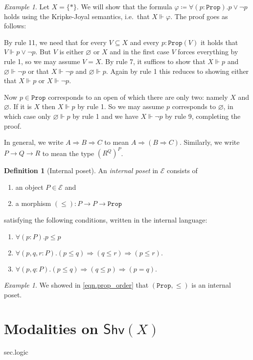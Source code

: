 \documentclass[11pt, oneside, article]{memoir}
\theoremstyle{plain}
\theoremstyle{definition}
\newtheorem{definition}[theorem]{Definition}
\theoremstyle{remark}
\newtheorem{example}[theorem]{Example}
\renewcommand{\ss}{\subseteq}
\newcommand{\const}[1]{\mathtt{#1}}
\newcommand{\cat}[1]{\mathcal{#1}}
\newcommand{\Fun}[1]{\mathsf{#1}}
\newcommand{\forces}{\Vdash}
\newcommand{\shv}{\Fun{Shv}}
\newcommand{\prop}{\const{Prop}}
\newcommand{\imp}{\Rightarrow}
\begin{document}
\begin{example}
Let $X=\{*\}$. We will show that the formula $\varphi\coloneqq\forall (p:\prop).p\vee\neg p$ holds using the Kripke-Joyal semantics, i.e.\ that $X\forces\varphi$. The proof goes as follows:

By rule 11, we need that for every $V\ss X$ and every $p:\prop(V)$ it holds that $V\forces p\vee\neg p$. But $V$ is either $\varnothing$ or $X$ and in the first case $V$ forces everything by rule 1, so we may assume $V=X$. By rule 7, it suffices to show that $X\forces p$ and $\varnothing\forces\neg p$ or that $X\forces\neg p$ and $\varnothing\forces p$. Again by rule 1 this reduces to showing either that $X\forces p$ or $X\forces\neg p$.

Now $p\in\prop$ corresponds to an open of which there are only two: namely $X$ and $\varnothing$. If it is $X$ then $X\forces p$ by rule 1. So we may assume $p$ corresponds to $\varnothing$, in which case only $\varnothing\forces p$ by rule 1 and we have $X\forces\neg p$ by rule 9, completing the proof.
\end{example}

In general, we write $A\imp B\imp C$ to mean $A\imp(B\imp C)$. Similarly, we write $P\to Q\to R$ to mean the type $(R^Q)^P$.

\begin{definition}[Internal poset]\label{def.internal_poset}
An \emph{internal poset} in $\cat{E}$ consists of
\begin{enumerate}
	\item an object $P\in\cat{E}$ and
	\item a morphism $(\leq)\colon P\to P\to\prop$
\end{enumerate}
satisfying the following conditions, written in the internal language:
\begin{enumerate}[label=\alph*.]
	\item $\forall (p:P).p\leq p$
	\item $\forall (p,q,r:P).(p\leq q)\imp (q\leq r)\imp(p\leq r)$.
	\item $\forall (p,q:P).(p\leq q)\imp(q\leq p)\imp (p=q).$
\end{enumerate}
\end{definition}

\begin{example}
We showed in \cref{eqn.prop_order} that $(\prop,\leq)$ is an internal poset.
\end{example}

\section{Modalities on $\shv(X)$}\label{sec.modalities}sec.logic
\end{document}
